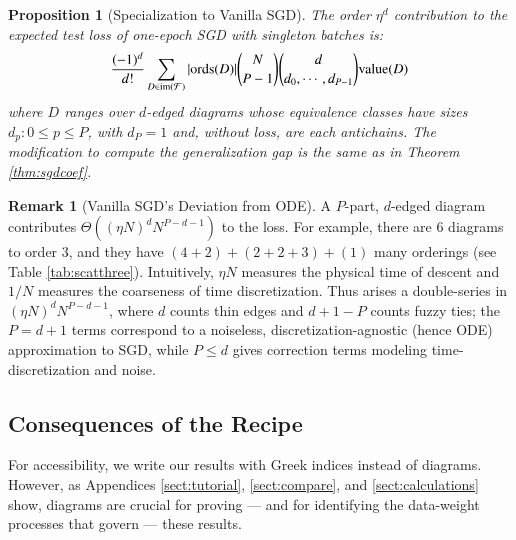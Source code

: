\documentclass{article}
\theoremstyle{plain}
\newtheorem{prop}{Proposition}
\theoremstyle{definition}
\newtheorem{rmk}{Remark}
\newcommand{\Free}{\mathcal{F}}
\newcommand{\image}{\text{\textnormal{im}}}
\newcommand{\dvalue}{\text{\textnormal{value}}}
\newcommand{\ords}{\text{\textnormal{ords}}}
\begin{document}
        \begin{prop}[Specialization to Vanilla SGD] \label{prop:vanilla}
            The order $\eta^d$ contribution to the expected test loss of
            one-epoch SGD with singleton batches is:
            \begin{equation*}\label{eq:sgdbasiccoef}
                \frac{(-1)^d}{d!} \sum_{D\in \image(\Free)} 
                |\ords(D)| {N \choose P-1} {d \choose d_0,\cdots,d_{P-1}}
                \dvalue(D)
            \end{equation*}
            where $D$ ranges over $d$-edged diagrams whose equivalence classes
            have sizes $d_p: 0\leq p\leq P$, with $d_P=1$
            and, without loss, are each antichains.  The modification to
            compute the generalization gap is the same as in Theorem
            \ref{thm:sgdcoef}.
        \end{prop}
        \begin{rmk}[Vanilla SGD's Deviation from ODE] \label{rmk:vsode}
            A $P$-part, $d$-edged diagram contributes $\Theta\left((\eta N)^d
            N^{P-d-1}\right)$ to the loss.  For example, there are $6$ diagrams
            to order $3$, and they have $(4+2)+(2+2+3)+(1)$ many orderings (see
            Table \ref{tab:scatthree}).  Intuitively, $\eta N$ measures the
            physical time of descent and $1/N$ measures the coarseness of time
            discretization.  Thus arises a double-series in $(\eta N)^d
            N^{P-d-1}$, where $d$ counts thin edges and $d+1-P$ counts fuzzy
            ties; the $P=d+1$ terms correspond to a noiseless,
            discretization-agnostic (hence ODE) approximation to SGD, while
            $P\leq d$ gives correction terms modeling time-discretization and
            noise.  
        \end{rmk}

    \subsection{Consequences of the Recipe}


        For accessibility, we write our results with Greek indices instead of
        diagrams.  However, as Appendices \ref{sect:tutorial},
        \ref{sect:compare}, and \ref{sect:calculations} show, diagrams are
        crucial for proving --- and for identifying the data-weight processes
        that govern --- these results.
\end{document}
